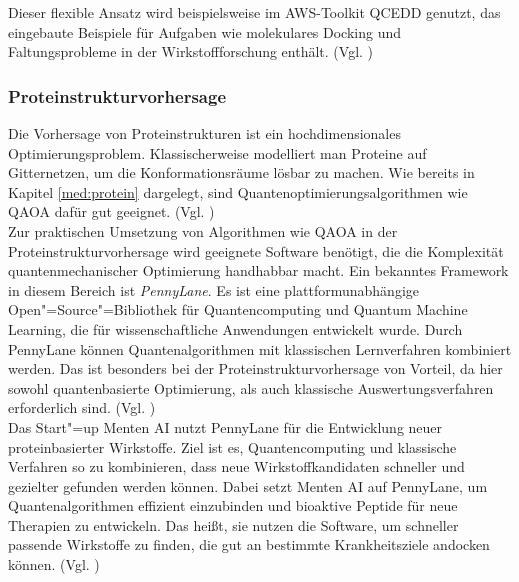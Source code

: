 Dieser flexible Ansatz wird beispielsweise im AWS-Toolkit QCEDD genutzt, das eingebaute Beispiele für Aufgaben wie molekulares Docking und Faltungsprobleme in der Wirkstoffforschung enthält. (Vgl. \cite{amazonscience})\\ %


\subsubsection*{Proteinstrukturvorhersage}
Die Vorhersage von Proteinstrukturen ist ein hochdimensionales Optimierungsproblem. Klassischerweise modelliert man Proteine auf Gitternetzen, um die Konformationsräume lösbar zu machen. Wie bereits in Kapitel \ref{med:protein} dargelegt, sind Quantenoptimierungsalgorithmen wie QAOA dafür gut geeignet. (Vgl. \cite{boulebnane})\\

Zur praktischen Umsetzung von Algorithmen wie QAOA in der Proteinstrukturvorhersage wird geeignete Software benötigt, die die Komplexität quantenmechanischer Optimierung handhabbar macht. Ein bekanntes Framework in diesem Bereich ist \textit{PennyLane}. Es ist eine plattformunabhängige Open"=Source"=Bibliothek für Quantencomputing und Quantum Machine Learning, die für wissenschaftliche Anwendungen entwickelt wurde. Durch PennyLane können Quantenalgorithmen mit klassischen Lernverfahren kombiniert werden. Das ist besonders bei der Proteinstrukturvorhersage von Vorteil, da hier sowohl quantenbasierte Optimierung, als auch klassische Auswertungsverfahren erforderlich sind. (Vgl. \cite{PennyLane})\\

Das Start"=up Menten AI nutzt PennyLane für die Entwicklung neuer proteinbasierter Wirkstoffe. Ziel ist es, Quantencomputing und klassische Verfahren so zu kombinieren, dass neue Wirkstoffkandidaten schneller und gezielter gefunden werden können. Dabei setzt Menten AI auf PennyLane, um Quantenalgorithmen effizient einzubinden und bioaktive Peptide für neue Therapien zu entwickeln. Das heißt, sie nutzen die Software, um schneller passende Wirkstoffe zu finden, die gut an bestimmte Krankheitsziele andocken können. (Vgl. \cite{xanadu2022})\\



